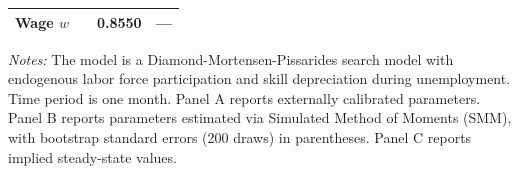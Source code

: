 \begin{table}[H]
\begin{threeparttable}
\begin{tabular}{llcc}
Wage $w$ & & 0.8550 & --- \\
\bottomrule
\end{tabular}
\begin{tablenotes}[flushleft]
\small
\item \textit{Notes:} The model is a Diamond-Mortensen-Pissarides search model with endogenous labor force participation and skill depreciation during unemployment. Time period is one month. Panel A reports externally calibrated parameters. Panel B reports parameters estimated via Simulated Method of Moments (SMM), with bootstrap standard errors (200 draws) in parentheses. Panel C reports implied steady-state values.
\end{tablenotes}
\end{threeparttable}
\label{tab:calibration}
\end{table}
